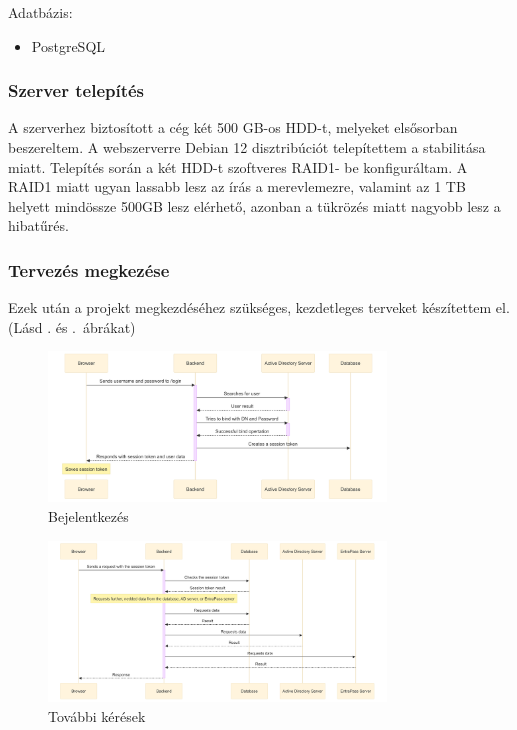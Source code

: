 \documentclass[a4paper]{article}
\begin{document}
Adatbázis:
\begin{itemize}
  \item PostgreSQL
\end{itemize}

\subsubsection*{Szerver telepítés}
A szerverhez biztosított a cég két 500 GB-os HDD-t, melyeket elsősorban beszereltem. A webszerverre
Debian 12 disztribúciót telepítettem a stabilitása miatt. Telepítés során a két HDD-t szoftveres RAID1-
be konfiguráltam. A RAID1 miatt ugyan lassabb lesz az írás a merevlemezre, valamint az 1 TB helyett
mindössze 500GB lesz elérhető, azonban a tükrözés miatt nagyobb lesz a hibatűrés.

\subsubsection*{Tervezés megkezése}
Ezek után a projekt megkezdéséhez szükséges, kezdetleges terveket készítettem el.
(Lásd . és .~ábrákat)\\

\begin{figure}[ht]
  \centering
  \includegraphics[width = 0.8\textwidth]{images/login_diagram.png}
  \caption{Bejelentkezés}
  \label{fig:login_diagram}
\end{figure}
\begin{center}
\end{center}

\begin{figure}[ht]
  \centering
  \includegraphics[width = 0.8\textwidth]{images/further_requests_diagram.png}
  \caption{További kérések}
  \label{fig:further_requests_diagram}
\end{figure}
\begin{center}
\end{center}
\end{document}
